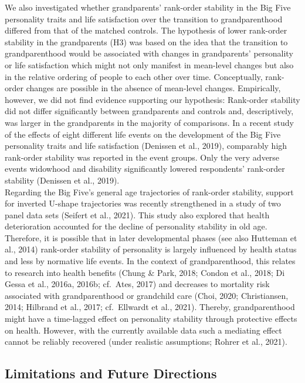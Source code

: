\documentclass[
  english,
  man, noextraspace]{apa7}
\begin{document}
We also investigated whether grandparents' rank-order stability in the Big Five personality traits and life satisfaction over the transition to grandparenthood differed from that of the matched controls. The hypothesis of lower rank-order stability in the grandparents (H3) was based on the idea that the transition to grandparenthood would be associated with changes in grandparents' personality or life satisfaction which might not only manifest in mean-level changes but also in the relative ordering of people to each other over time. Conceptually, rank-order changes are possible in the absence of mean-level changes. Empirically, however, we did not find evidence supporting our hypothesis: Rank-order stability did not differ significantly between grandparents and controls and, descriptively, was larger in the grandparents in the majority of comparisons. In a recent study of the effects of eight different life events on the development of the Big Five personality traits and life satisfaction (Denissen et al., 2019), comparably high rank-order stability was reported in the event groups. Only the very adverse events widowhood and disability significantly lowered respondents' rank-order stability (Denissen et al., 2019).\\
Regarding the Big Five's general age trajectories of rank-order stability, support for inverted U-shape trajectories was recently strengthened in a study of two panel data sets (Seifert et al., 2021). This study also explored that health deterioration accounted for the decline of personality stability in old age. Therefore, it is possible that in later developmental phases (see also Hutteman et al., 2014) rank-order stability of personality is largely influenced by health status and less by normative life events. In the context of grandparenthood, this relates to research into health benefits (Chung \& Park, 2018; Condon et al., 2018; Di Gessa et al., 2016a, 2016b; cf.~Ates, 2017) and decreases to mortality risk associated with grandparenthood or grandchild care (Choi, 2020; Christiansen, 2014; Hilbrand et al., 2017; cf.~Ellwardt et al., 2021). Thereby, grandparenthood might have a time-lagged effect on personality stability through protective effects on health. However, with the currently available data such a mediating effect cannot be reliably recovered (under realistic assumptions; Rohrer et al., 2021).

\hypertarget{limitations-and-future-directions}{%
\subsection{Limitations and Future Directions}\label{limitations-and-future-directions}}
\end{document}
